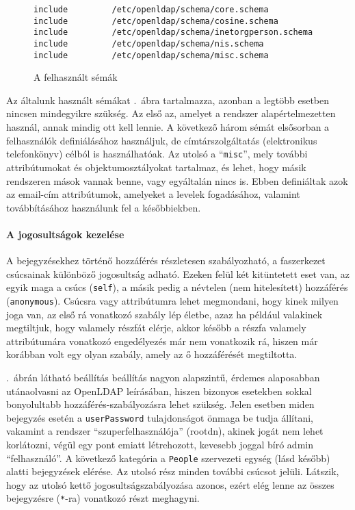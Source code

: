 \begin{figure}
\begin{Verbatim}[frame=single]
include         /etc/openldap/schema/core.schema
include         /etc/openldap/schema/cosine.schema
include         /etc/openldap/schema/inetorgperson.schema
include         /etc/openldap/schema/nis.schema
include         /etc/openldap/schema/misc.schema
\end{Verbatim}
  \caption{A felhasznált sémák}
  \label{fig:ldap-schemas}
\end{figure}
  

Az általunk használt sémákat .\ ábra tartalmazza, azonban a legtöbb esetben nincsen mindegyikre
szükség. Az első az, amelyet a rendszer alapértelmezetten használ, annak mindig ott kell lennie. A következő három sémát
elsősorban a felhasználók definiálásához használjuk, de címtárszolgáltatás (elektronikus telefonkönyv) célból is
használhatóak. Az utolsó a ``\texttt{misc}'', mely további attribútumokat és
objektumosztályokat tartalmaz, és lehet, hogy másik rendszeren mások vannak benne, vagy egyáltalán nincs is. Ebben
definiáltak azok  az email-cím attribútumok, amelyeket a levelek fogadásához, valamint továbbításához használunk fel a
későbbiekben.

\paragraph{A jogosultságok kezelése}
A bejegyzésekhez történő hozzáférés részletesen szabályozható, a faszerkezet csúcsainak különböző jogosultság
adható. Ezeken felül két kitüntetett eset van, az egyik maga a csúcs (\texttt{self}), a másik pedig a névtelen (nem
hitelesített) hozzáférés (\texttt{anonymous}). Csúcsra vagy attribútumra lehet megmondani, hogy kinek milyen joga van,
az első rá vonatkozó szabály lép életbe, azaz ha például valakinek megtiltjuk, hogy valamely részfát elérje, akkor
később a részfa valamely attribútumára vonatkozó engedélyezés már nem vonatkozik rá, hiszen már korábban volt egy olyan
szabály, amely az ő hozzáférését megtiltotta.

 
.\ ábrán látható beállítás beállítás nagyon alapszintű, érdemes alaposabban utánaolvasni az OpenLDAP
leírásában, hiszen bizonyos esetekben sokkal bonyolultabb hozzáférés-szabályozásra lehet szükség. Jelen esetben miden
bejegyzés esetén a \texttt{userPassword} tulajdonságot önmaga be tudja állítani, vakamint a rendszer
``szuperfelhasználója'' (rootdn), akinek jogát nem lehet korlátozni, végül egy pont emiatt létrehozott, kevesebb joggal
bíró admin ``felhasználó''. A következő kategória a \texttt{People} szervezeti egység (lásd később) alatti bejegyzések
elérése. Az utolsó rész minden további csúcsot jelüli. Látszik, hogy az utolsó kettő jogosultságszabályozása azonos,
ezért elég lenne az összes bejegyzésre (\texttt{*}-ra) vonatkozó részt meghagyni.

